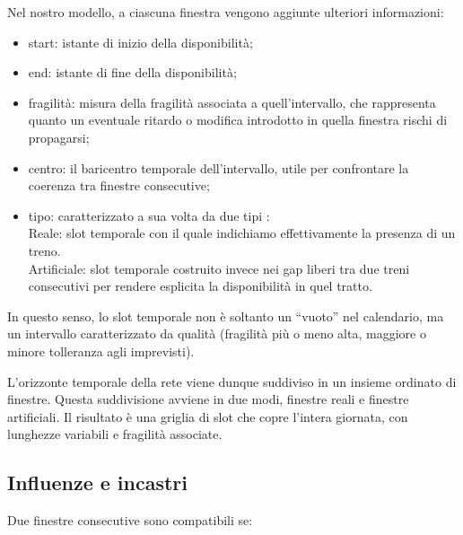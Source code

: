 \documentclass[a4paper,12pt]{report}
\begin{document}
Nel nostro modello, a ciascuna finestra vengono aggiunte ulteriori informazioni:

\begin{itemize}
 \item start: istante di inizio della disponibilità;


 \item end: istante di fine della disponibilità;

 \item fragilità: misura della fragilità associata a quell’intervallo, che rappresenta quanto un eventuale ritardo o modifica introdotto in quella finestra rischi di propagarsi;

 \item centro: il baricentro temporale dell’intervallo, utile per confrontare la coerenza tra finestre consecutive;

 \item tipo: caratterizzato a sua volta da due tipi : \\
  Reale: slot temporale con il quale indichiamo effettivamente la presenza di un treno. \\
  Artificiale: slot temporale costruito invece nei gap liberi tra due treni consecutivi per rendere esplicita la disponibilità in quel tratto.

\end{itemize} 

In questo senso, lo slot temporale non è soltanto un “vuoto” nel calendario, ma un intervallo caratterizzato da qualità (fragilità più o meno alta, maggiore o minore tolleranza agli imprevisti).

L’orizzonte temporale della rete viene dunque suddiviso in un insieme ordinato di finestre. 
Questa suddivisione avviene in due modi, finestre reali e finestre artificiali.
Il risultato è una griglia di slot che copre l’intera giornata, con lunghezze variabili e fragilità associate.



\subsection{Influenze e incastri}

Due finestre consecutive sono compatibili se:
\end{document}
